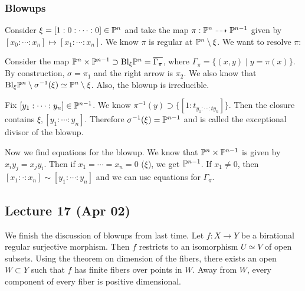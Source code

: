 \documentclass[twoside, 10pt]{article}
\begin{document}
    \subsubsection{Blowups}
    \begin{exm}
        Consider $\xi = [1:0:\cdots:0] \in \P^n$ and take the map $\pi: \P^n \dashrightarrow \P^{n-1}$ given by $[x_0: \cdots :x_n] \mapsto [x_1:\cdots:x_n]$. We know $\pi$ is regular at $\P^n \setminus \xi$. We want to resolve $\pi$:

        \begin{center}
        \end{center}

        Consider the map $\P^n \times \P^{n-1} \supset \mathrm{Bl}_{\xi}\P^n = \overline{\Gamma_{\pi}}$, where $\Gamma_{\pi} = \{(x,y) \mid y = \pi(x) \}$. By construction, $\sigma = \pi_1$ and the right arrow is $\pi_2$. We also know that $\mathrm{Bl}_{\xi}\P^n \setminus \sigma^{-1}(\xi) \simeq \P^n \setminus \xi$. Also, the blowup is irreducible. 
        
        Fix $[y_1: \cdots: y_n] \in \P^{n-1}$. We know $\pi^{-1}(y) \supset \{[1:t_{y_1: \cdots : ty_n}]\}$. Then the closure contains $\xi, [y_1: \cdots : y_n]$. Therefore $\sigma^{-1}(\xi) = \P^{n-1}$ and is called the exceptional divisor of the blowup.

        Now we find equations for the blowup. We know that $\P^n \times \P^{n-1}$ is given by $x_iy_j = x_jy_i$. Then if $x_1 = \cdots = x_n = 0$ ($\xi$), we get $\P^{n-1}$. If $x_1 \neq 0$, then $[x_1:\cdot : x_n] \sim [y_1: \cdots : y_n]$ and we can use equations for $\Gamma_{\pi}$.
    \end{exm}

    \subsection{Lecture 17 (Apr 02)}
    We finish the discussion of blowups from last time. Let $f:X \to Y$ be a birational regular surjective morphism. Then $f$ restricts to an isomorphism $U \simeq V$ of open subsets. Using the theorem on dimension of the fibers, there exists an open $W \subset Y$ such that $f$ has finite fibers over points in $W$. Away from $W$, every component of every fiber is positive dimensional.
\end{document}
